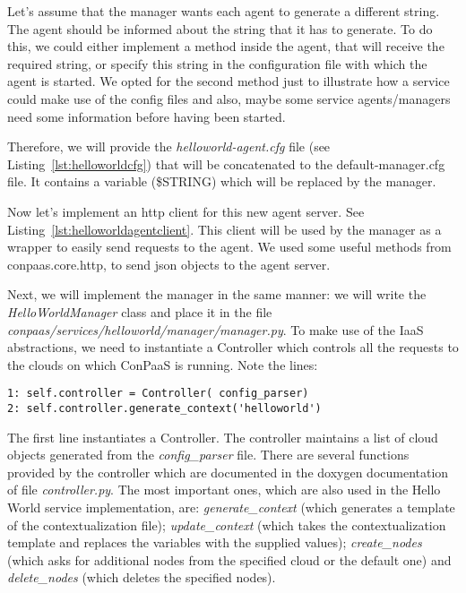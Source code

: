 \documentclass[10pt]{article}
\newcommand{\ConPaaSHOME}{..}
\begin{document}


Let's assume that the manager wants each agent to generate a different string. The agent should be informed about the string that it has to generate. To do this, we could either implement a method inside the agent, that will receive the required string, or specify this string in the configuration file with which the agent is started. We opted for the second method just to illustrate how a service could make use of the config files and also, maybe some service agents/managers need some information before having been started.

Therefore, we will provide the \textit{helloworld-agent.cfg} file (see Listing~\ref{lst:helloworldcfg}) that will be concatenated to the default-manager.cfg file. It contains a variable (\$STRING) which will be replaced by the manager.
 


Now let's implement an http client for this new agent server. See Listing~\ref{lst:helloworldagentclient}. This client will be used by the manager as a wrapper to easily send requests to the agent. We used some useful methods from conpaas.core.http, to send json objects to the agent server. 



Next, we will implement the manager in the same manner: we will write the \textit{HelloWorldManager} class and place it in the file \textit{conpaas/services/helloworld/manager/manager.py}. To make use of the IaaS abstractions, we need to instantiate a Controller which controls all the requests to the clouds on which ConPaaS is running. Note the lines: 

\begin{lstlisting}
1: self.controller = Controller( config_parser)
2: self.controller.generate_context('helloworld')
\end{lstlisting}

The first line instantiates a Controller. The controller maintains a list of cloud objects generated from the \textit{config\_parser} file. There are several functions provided by the controller which are documented in the doxygen documentation of file \textit{controller.py}. The most important ones, which are also used in the Hello World service implementation, are: \textit{generate\_context} (which generates a template of the contextualization file); \textit{update\_context} (which takes the contextualization template and replaces the variables with the supplied values); \textit{create\_nodes} (which asks for additional nodes from the specified cloud or the default one) and \textit{delete\_nodes} (which deletes the specified nodes).
\end{document}
